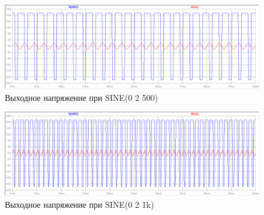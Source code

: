 \documentclass[a4paper, 12pt]{article}
\begin{document}
    \begin{figure}[H]
        \centering
        \includegraphics[scale=0.46]{6task_sine_2V_500f.png}
        \captionsetup{skip=0pt}
        \caption{Выходное напряжение при SINE(0 2 500)}
        \label{fig:6task_sine_2V_500f}
    \end{figure}
    \begin{figure}[H]
        \centering
        \includegraphics[scale=0.46]{6task_sine_2V_1kf.png}
        \captionsetup{skip=0pt}
        \caption{Выходное напряжение при SINE(0 2 1k)}
        \label{fig:6task_sine_2V_1kf}
    \end{figure}
\end{document}
